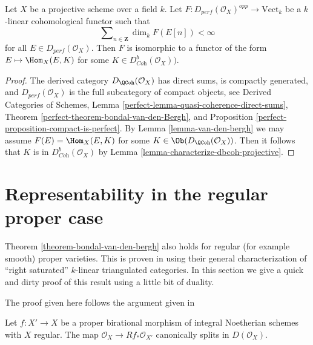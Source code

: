 \begin{theorem}
\label{theorem-bondal-van-den-bergh}
\begin{reference}
\cite[Theorem A.1]{BvdB}
\end{reference}
Let $X$ be a projective scheme over a field $k$.
Let $F : D_{perf}(\mathcal{O}_X)^{opp} \to \text{Vect}_k$
be a $k$-linear cohomological functor such that
$$
\sum\nolimits_{n \in \mathbf{Z}} \dim_k F(E[n]) < \infty
$$
for all $E \in D_{perf}(\mathcal{O}_X)$. Then $F$ is isomorphic to a functor
of the form $E \mapsto \Hom_X(E, K)$ for some
$K \in D^b_{\textit{Coh}}(\mathcal{O}_X))$.
\end{theorem}

\begin{proof}
The derived category $D_\QCoh(\mathcal{O}_X)$ has direct sums,
is compactly generated, and $D_{perf}(\mathcal{O}_X)$ is the full subcategory
of compact objects, see
Derived Categories of Schemes, Lemma
\ref{perfect-lemma-quasi-coherence-direct-sums},
Theorem \ref{perfect-theorem-bondal-van-den-Bergh}, and
Proposition \ref{perfect-proposition-compact-is-perfect}.
By Lemma \ref{lemma-van-den-bergh} we may assume
$F(E) = \Hom_X(E, K)$ for some $K \in \Ob(D_\QCoh(\mathcal{O}_X))$.
Then it follows that $K$ is in $D^b_{\textit{Coh}}(\mathcal{O}_X)$
by Lemma \ref{lemma-characterize-dbcoh-projective}.
\end{proof}




\section{Representability in the regular proper case}
\label{section-regular-proper}

\noindent
Theorem \ref{theorem-bondal-van-den-bergh}
also holds for regular (for example smooth) proper varieties. This
is proven in \cite{BvdB} using their general characterization
of ``right saturated'' $k$-linear triangulated categories. In this
section we give a quick and dirty proof of this result using a little
bit of duality.

\begin{lemma}
\label{lemma-trace-map}
\begin{reference}
The proof given here follows the argument given in
\cite[Remark 3.4]{MS}
\end{reference}
Let $f : X' \to X$ be a proper birational morphism of integral Noetherian
schemes with $X$ regular. The map $\mathcal{O}_X \to Rf_*\mathcal{O}_{X'}$
canonically splits in $D(\mathcal{O}_X)$.
\end{lemma}

